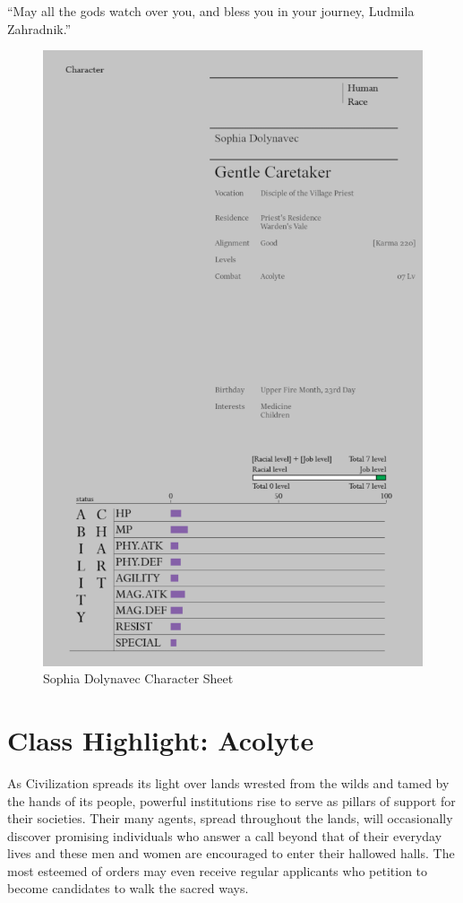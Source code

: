  

“May all the gods watch over you, and bless you in your journey, Ludmila Zahradnik.”

\begin{figure}
    \centering
    \includegraphics[width=0.8\linewidth]{images/FydzDim.png}
    \caption*{Sophia Dolynavec Character Sheet}
    \label{fig:placeholder}
\end{figure}

\section*{Class Highlight: Acolyte}
As Civilization spreads its light over lands wrested from the wilds and tamed by the hands of its people, powerful institutions rise to serve as pillars of support for their societies. Their many agents, spread throughout the lands, will occasionally discover promising individuals who answer a call beyond that of their everyday lives and these men and women are encouraged to enter their hallowed halls. The most esteemed of orders may even receive regular applicants who petition to become candidates to walk the sacred ways.

